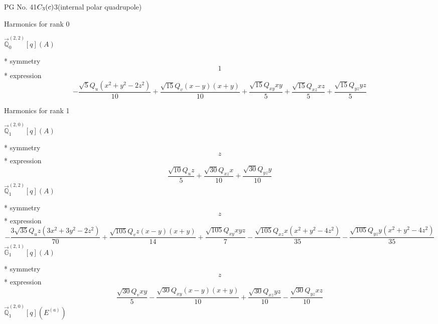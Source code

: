 \documentclass[fleqn,8pt]{jsarticle}
\begin{document}
\setcounter{MaxMatrixCols}{32}

\renewcommand{\tablename}{Table~}
\renewcommand{\figurename}{Figure~}
\begin{center}
\LARGE
PG No. 41\quad$C_{\rm 3}(c)$\quad$3$\quad[ trigonal ] (internal polar quadrupole)
\end{center}

\noindent * Harmonics for rank 0

\noindent\quad $\vec{\mathbb{Q}}_{0}^{(2,2)}[q](A)$

\noindent\quad ** symmetry
\begin{dmath*}
1
\end{dmath*}
\noindent\quad ** expression
\begin{dmath*}
- \frac{\sqrt{5} Q_{u} \left(x^{2} + y^{2} - 2 z^{2}\right)}{10} + \frac{\sqrt{15} Q_{v} \left(x - y\right) \left(x + y\right)}{10} + \frac{\sqrt{15} Q_{xy} x y}{5} + \frac{\sqrt{15} Q_{xz} x z}{5} + \frac{\sqrt{15} Q_{yz} y z}{5}
\end{dmath*}

\noindent * Harmonics for rank 1

\noindent\quad $\vec{\mathbb{Q}}_{1}^{(2,0)}[q](A)$

\noindent\quad ** symmetry
\begin{dmath*}
z
\end{dmath*}
\noindent\quad ** expression
\begin{dmath*}
\frac{\sqrt{10} Q_{u} z}{5} + \frac{\sqrt{30} Q_{xz} x}{10} + \frac{\sqrt{30} Q_{yz} y}{10}
\end{dmath*}
\noindent\quad $\vec{\mathbb{Q}}_{1}^{(2,2)}[q](A)$

\noindent\quad ** symmetry
\begin{dmath*}
z
\end{dmath*}
\noindent\quad ** expression
\begin{dmath*}
- \frac{3 \sqrt{35} Q_{u} z \left(3 x^{2} + 3 y^{2} - 2 z^{2}\right)}{70} + \frac{\sqrt{105} Q_{v} z \left(x - y\right) \left(x + y\right)}{14} + \frac{\sqrt{105} Q_{xy} x y z}{7} - \frac{\sqrt{105} Q_{xz} x \left(x^{2} + y^{2} - 4 z^{2}\right)}{35} - \frac{\sqrt{105} Q_{yz} y \left(x^{2} + y^{2} - 4 z^{2}\right)}{35}
\end{dmath*}
\noindent\quad $\vec{\mathbb{G}}_{1}^{(2,1)}[q](A)$

\noindent\quad ** symmetry
\begin{dmath*}
z
\end{dmath*}
\noindent\quad ** expression
\begin{dmath*}
\frac{\sqrt{30} Q_{v} x y}{5} - \frac{\sqrt{30} Q_{xy} \left(x - y\right) \left(x + y\right)}{10} + \frac{\sqrt{30} Q_{xz} y z}{10} - \frac{\sqrt{30} Q_{yz} x z}{10}
\end{dmath*}
\noindent\quad $\vec{\mathbb{Q}}_{1}^{(2,0)}[q](E^{(a)})$
\end{document}
